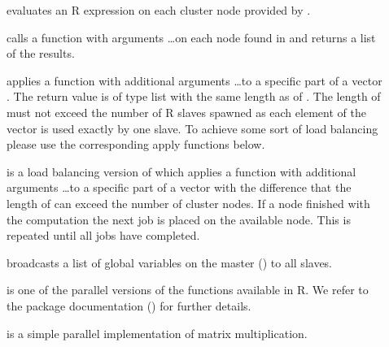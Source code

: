 \begin{description}
\item[] evaluates an R expression
   on
  each cluster node provided by . 
\item[] calls a function
   with arguments \ldots on each node found in 
  and returns a list of the results.
\item[] applies a function
   with additional arguments \ldots to a specific part of
  a vector . The return value is of type list with the same
  length as of . The length of
   must not exceed the 
  number of R slaves spawned as each element of the vector is used
  exactly by one slave. To achieve some sort of load balancing please
  use the corresponding apply functions below.
\item[] is a load balancing
  version of  which applies a function
   with additional arguments \ldots to a specific part of
  a vector  with the difference that the length of
   can exceed the number of cluster nodes. If a node
  finished with the computation the next job is placed on the
  available node. This is repeated until all jobs have completed.
\item[] broadcasts a list of global
  variables on the master () to all slaves.
\item[] is one of the parallel
  versions of the  functions available in R. We refer to
  the package documentation (\cite{tierney07snow}) for further details.
\item[] is a simple parallel implementation of
  matrix multiplication. 
\end{description}


